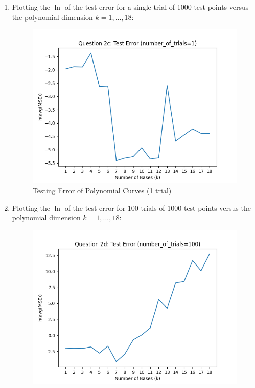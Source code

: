 \documentclass[12pt]{article}
\begin{document}
\begin{enumerate}[leftmargin=\labelsep]
\begin{enumerate}
        \item Plotting the $\ln$ of the test error for a single trial of 1000 test points versus the polynomial dimension $k = 1, . . . , 18$:
            \begin{figure}[h]
            \centering
            \includegraphics[scale=0.5]{outputs/q2/q2c}
            \caption{Testing Error of Polynomial Curves (1 trial)}
            \label{fig:2c}
            \end{figure}
\newpage
        \item Plotting the $\ln$ of the test error for 100 trials of 1000 test points versus the polynomial dimension $k = 1, . . . , 18$:
            \begin{figure}[h]
            \centering
            \includegraphics[scale=0.5]{outputs/q2/q2d}

\end{figure}
\end{enumerate}
\end{enumerate}
\end{document}
